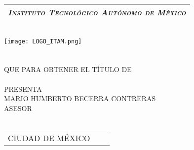 
\thispagestyle{empty}
\begin{titlepage}

	\begin{center}
	\vspace{70pt}
		\begin{tabular}{c}
			\Large \emph{\textsc{Instituto Tecnológico Autónomo de México}}\\
			\hline
		\end{tabular}\\
		\vspace{25pt}
		\texttt{[image: LOGO\_ITAM.png]}\\
		\vspace{25pt}
		{\huge \thetitle}\\
		\vspace{5pt}
		\vspace{20 pt}
		{\Large \thethesis } \\
		\vspace{5pt}
		QUE PARA OBTENER EL TÍTULO DE \\
		\vspace{5pt}
		{\Large \thedegree} \\
		\vspace{5pt}
		PRESENTA \\
		\vspace{5pt}
		{\Large MARIO HUMBERTO BECERRA CONTRERAS} \\
		\vfill
		ASESOR \\
		{\Large \theadvisor} \\
		\vspace{5pt}
		\begin{tabular}{lcr}
			CIUDAD DE MÉXICO & \hspace{60pt} & \theyear
		\end{tabular}
	\end{center}
\end{titlepage}
